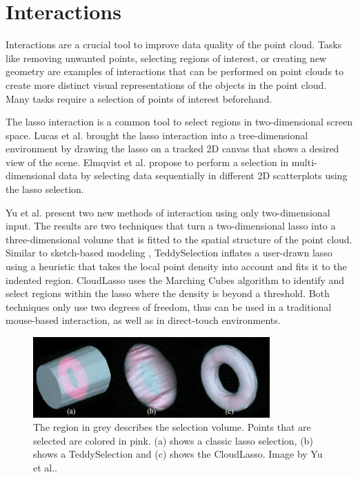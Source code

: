 \section {Interactions}
\label{sec:related_work_interactions}

Interactions are a crucial tool to improve data quality of the point cloud. Tasks like removing unwanted points, selecting regions of interest, or creating new geometry are examples of interactions that can be performed on point clouds to create more distinct visual representations of the objects in the point cloud. Many tasks require a selection of points of interest beforehand. 

\par

The lasso interaction is a common tool to select regions in two-dimensional screen space. Lucas et al. \cite{lucas2005design} brought the lasso interaction into a tree-dimensional environment by drawing the lasso on a tracked 2D canvas that shows a desired view of the scene. Elmqvist et al. \cite{elmqvist2008rolling} propose to perform a selection in multi-dimensional data by selecting data sequentially in different 2D scatterplots using the lasso selection. 

\par

Yu et al. \cite{yu2012efficient} present two new methods of interaction using only two-dimensional input. The results are two techniques that turn a two-dimensional lasso into a three-dimensional volume that is fitted to the spatial structure of the point cloud. Similar to sketch-based modeling \cite{igarashi2007teddy}, TeddySelection inflates a user-drawn lasso using a heuristic that takes the local point density into account and fits it to the indented region. CloudLasso uses the Marching Cubes algorithm \cite{lorensen1987marching} to identify and select regions within the lasso where the density is beyond a threshold. Both techniques only use two degrees of freedom, thus can be used in a traditional mouse-based interaction, as well as in direct-touch environments. 

\begin{figure}[ht]
    \centering
    \includegraphics[width=0.81\textwidth]{Related_Work/teddyCloudSelection.png}%
    \caption[Comparison of (a) simple lasso selection, (b) TeddySelection and (c) CloudLasso]
		{The region in grey describes the selection volume. Points that are selected are colored in pink. (a) shows a classic lasso selection, (b) shows a TeddySelection and (c) shows the CloudLasso. Image by Yu et al.\cite{yu2012efficient}.}
    \label{fig:teddyCloudSelection}
\end{figure}

